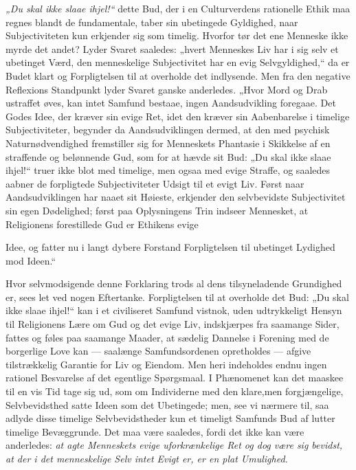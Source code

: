 \documentclass[12pt,a4paper]{book}
\begin{document}
\emph{„Du skal ikke slaae ihjel!“} dette Bud, der i en Culturverdens rationelle
Ethik maa regnes blandt de fundamentale, taber sin ubetingede Gyldighed, naar
Subjectiviteten kun erkjender sig som timelig. Hvorfor tør det ene Menneske ikke
myrde det andet? Lyder Svaret saaledes: „hvert Menneskes Liv har i sig selv et
ubetinget Værd, den menneskelige Subjectivitet har en evig Selvgyldighed,“ da er
Budet klart og Forpligtelsen til at overholde det indlysende. Men fra den
negative Reflexions Standpunkt lyder Svaret ganske anderledes. „Hvor Mord og Drab
ustraffet øves, kan intet Samfund bestaae, ingen Aandsudvikling foregaae. Det
Godes Idee, der kræver sin evige Ret, idet den kræver sin Aabenbarelse i timelige
Subjectiviteter, begynder da Aandsudviklingen dermed, at den med psychisk
Naturnødvendighed fremstiller sig for Menneskets Phantasie i Skikkelse af en
straffende og belønnende Gud, som for at hævde sit Bud: „Du skal ikke slaae
ihjel!“ truer ikke blot med timelige, men ogsaa med evige Straffe, og saaledes
aabner de forpligtede Subjectiviteter Udsigt til et evigt Liv. Først naar
Aandsudviklingen har naaet sit Høieste, erkjender den selvbevidste Subjectivitet
sin egen Dødelighed; først paa Oplysningens Trin indseer Mennesket, at
Religionens forestillede Gud er Ethikens evige

Idee, og fatter nu i langt dybere Forstand Forpligtelsen til ubetinget Lydighed
mod Ideen.“

Hvor selvmodsigende denne Forklaring trods al dens tilsyneladende Grundighed er,
sees let ved nogen Eftertanke. Forpligtelsen til at overholde det Bud: „Du skal
ikke slaae ihjel!“ kan i et civiliseret Samfund vistnok, uden udtrykkeligt Hensyn
til Religionens Lære om Gud og det evige Liv, indskjærpes fra saamange Sider,
fattes og føles paa saamange Maader, at sædelig Dannelse i Forening med de
borgerlige Love kan --- saalænge Samfundsordenen opretholdes --- afgive
tilstrækkelig Garantie for Liv og Eiendom. Men heri indeholdes endnu ingen
rationel Besvarelse af det egentlige Spørgsmaal. I Phænomenet kan det maaskee til
en vis Tid tage sig ud, som om Individerne med den klare,men forgjængelige,
Selvbevidsthed satte Ideen som det Ubetingede; men, see vi nærmere til, saa
adlyde disse timelige Selvbevidstheder kun et timeligt Samfunds Bud af lutter
timelige Bevæggrunde. Det maa være saaledes, fordi det ikke kan være anderledes:
\emph{at agte Menneskets evige uforkrænkelige Ret og dog være sig bevidst, at der
i det menneskelige Selv intet Evigt er, er en plat Umulighed.}
\end{document}
